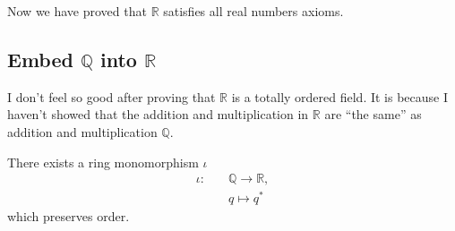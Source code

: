 Now we have proved that $\mathbb{R}$ satisfies all real numbers axioms.

\subsection{Embed $\mathbb{Q}$ into $\mathbb{R}$}

I don't feel so good after proving that $\mathbb{R}$ is a totally ordered field. It is because I haven't showed that the addition and multiplication in $\mathbb{R}$ are ``the same'' as addition and multiplication $\mathbb{Q}$.

\begin{theorem}
    There exists a ring monomorphism $\iota$
    \[
        \begin{split}
            \iota:\quad & \mathbb{Q}\to\mathbb{R}, \\
            & q\mapsto {q}^{*}
        \end{split}
    \]
    which preserves order.
\end{theorem}

